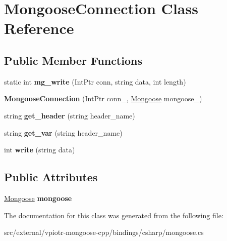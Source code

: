 \hypertarget{class_mongoose_connection}{\section{Mongoose\-Connection Class Reference}
\label{class_mongoose_connection}
}
\subsection*{Public Member Functions}
\begin{DoxyCompactItemize}
\item 
\hypertarget{class_mongoose_connection_ad0542d7ee49bcc6b694246ffbb7111ce}{static int {\bfseries mg\-\_\-write} (Int\-Ptr conn, string data, int length)}\label{class_mongoose_connection_ad0542d7ee49bcc6b694246ffbb7111ce}

\item 
\hypertarget{class_mongoose_connection_a516d17326f9e2a9a636d5089d919adca}{{\bfseries Mongoose\-Connection} (Int\-Ptr conn\-\_\-, \hyperlink{class_mongoose}{Mongoose} mongoose\-\_\-)}\label{class_mongoose_connection_a516d17326f9e2a9a636d5089d919adca}

\item 
\hypertarget{class_mongoose_connection_a23cc4db177f4ee87313d5c6dd76d3d5b}{string {\bfseries get\-\_\-header} (string header\-\_\-name)}\label{class_mongoose_connection_a23cc4db177f4ee87313d5c6dd76d3d5b}

\item 
\hypertarget{class_mongoose_connection_a5c0716ff08f588664955eb82d853b54c}{string {\bfseries get\-\_\-var} (string header\-\_\-name)}\label{class_mongoose_connection_a5c0716ff08f588664955eb82d853b54c}

\item 
\hypertarget{class_mongoose_connection_a47934f7735fdc0538b2ec9b1cdfb8098}{int {\bfseries write} (string data)}\label{class_mongoose_connection_a47934f7735fdc0538b2ec9b1cdfb8098}

\end{DoxyCompactItemize}
\subsection*{Public Attributes}
\begin{DoxyCompactItemize}
\item 
\hypertarget{class_mongoose_connection_afbf3a744e426198369fedab809c75b4f}{\hyperlink{class_mongoose}{Mongoose} {\bfseries mongoose}}\label{class_mongoose_connection_afbf3a744e426198369fedab809c75b4f}

\end{DoxyCompactItemize}


The documentation for this class was generated from the following file\-:\begin{DoxyCompactItemize}
\item 
src/external/vpiotr-\/mongoose-\/cpp/bindings/csharp/mongoose.\-cs\end{DoxyCompactItemize}
